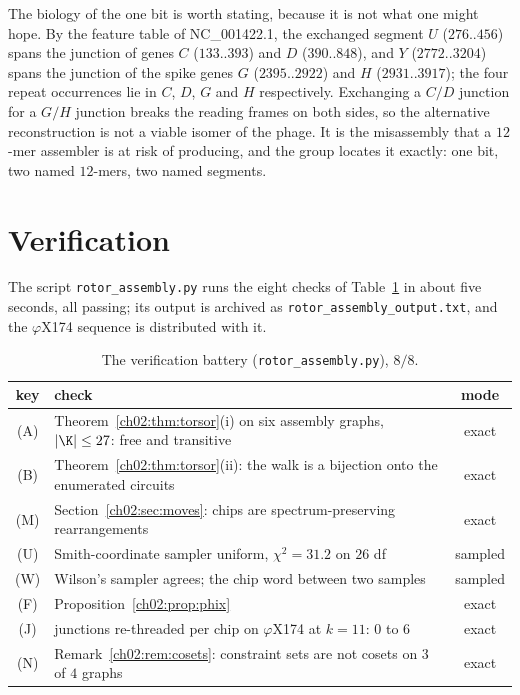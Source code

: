 The biology of the one bit is worth stating, because it is not what one might hope. By
the feature table of NC\_001422.1, the exchanged segment $U$ ($276..456$) spans the
junction of genes $C$ ($133..393$) and $D$ ($390..848$), and $Y$ ($2772..3204$) spans the
junction of the spike genes $G$ ($2395..2922$) and $H$ ($2931..3917$); the four repeat
occurrences lie in $C$, $D$, $G$ and $H$ respectively. Exchanging a $C/D$ junction for a
$G/H$ junction breaks the reading frames on both sides, so the alternative reconstruction
is not a viable isomer of the phage. It is the misassembly that a $12$-mer assembler is at
risk of producing, and the group locates it exactly: one bit, two named $12$-mers, two
named segments.

\section{Verification}\label{ch02:sec:battery}

The script \texttt{rotor\_assembly.py} runs the eight checks of Table~\ref{ch02:tab:battery} in
about five seconds, all passing; its output is archived as
\texttt{rotor\_assembly\_output.txt}, and the $\varphi$X174 sequence is distributed with it.

\begin{table}[ht]
\centering\small
\begin{tabular}{clc}
\toprule
key & check & mode\\
\midrule
(A) & Theorem~\ref{ch02:thm:torsor}(i) on six assembly graphs, $|\K|\le27$: free and transitive & exact\\
(B) & Theorem~\ref{ch02:thm:torsor}(ii): the walk is a bijection onto the enumerated circuits & exact\\
(M) & Section~\ref{ch02:sec:moves}: chips are spectrum-preserving rearrangements & exact\\
(U) & Smith-coordinate sampler uniform, $\chi^{2}=31.2$ on $26$ df & sampled\\
(W) & Wilson's sampler agrees; the chip word between two samples & sampled\\
(F) & Proposition~\ref{ch02:prop:phix} & exact\\
(J) & junctions re-threaded per chip on $\varphi$X174 at $k=11$: $0$ to $6$ & exact\\
(N) & Remark~\ref{ch02:rem:cosets}: constraint sets are not cosets on $3$ of $4$ graphs & exact\\
\bottomrule
\end{tabular}
\caption{The verification battery (\texttt{rotor\_assembly.py}), $8/8$.}
\label{ch02:tab:battery}
\end{table}

